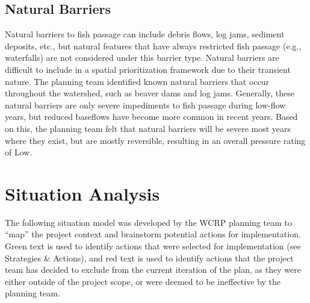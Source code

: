 \documentclass[
  letterpaper,
  DIV=11,
  numbers=noendperiod]{scrreprt}
\begin{document}
\hypertarget{natural-barriers}{%
\subsection*{Natural Barriers}\label{natural-barriers}}

Natural barriers to fish passage can include debris flows, log jams,
sediment deposits, etc., but natural features that have always
restricted fish passage (e.g., waterfalls) are not considered under this
barrier type. Natural barriers are difficult to include in a spatial
prioritization framework due to their transient nature. The planning
team identified known natural barriers that occur throughout the
watershed, such as beaver dams and log jams. Generally, these natural
barriers are only severe impediments to fish passage during low-flow
years, but reduced baseflows have become more common in recent years.
Based on this, the planning team felt that natural barriers will be
severe most years where they exist, but are mostly reversible, resulting
in an overall pressure rating of Low.

\hypertarget{situation-analysis}{%
\section*{Situation Analysis}\label{situation-analysis}}


The following situation model was developed by the WCRP planning team to
``map'' the project context and brainstorm potential actions for
implementation. Green text is used to identify actions that were
selected for implementation (see Strategies \& Actions), and red text is
used to identify actions that the project team has decided to exclude
from the current iteration of the plan, as they were either outside of
the project scope, or were deemed to be ineffective by the planning
team.
\end{document}
